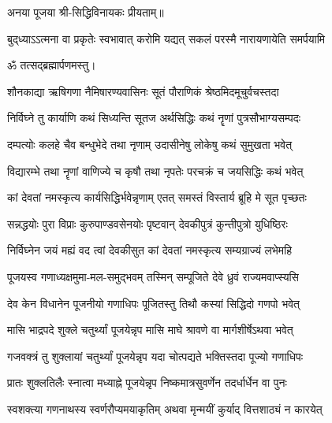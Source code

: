 \begin{center}
अनया पूजया श्री-सिद्धिविनायकः प्रीयताम्॥ 

{बुद्‌ध्याऽऽत्मना वा प्रकृतेः स्वभावात्}
{करोमि यद्यत् सकलं परस्मै}
{नारायणायेति समर्पयामि}

ॐ तत्सद्ब्रह्मार्पणमस्तु।


\twolineshloka
{शौनकाद्या ऋषिगणा नैमिषारण्यवासिनः}
{सूतं पौराणिकं श्रेष्ठमिदमूचुर्वचस्तदा}%


\twolineshloka
{निर्विघ्ने तु कार्याणि कथं सिध्यन्ति सूतज}
{अर्थसिद्धिः कथं नॄणां पुत्रसौभाग्यसम्पदः}%

\twolineshloka
{दम्पत्योः कलहे चैव बन्धुभेदे तथा नृणाम्}
{उदासीनेषु लोकेषु कथं सुमुखता भवेत्}%

\twolineshloka
{विद्यारम्भे तथा नॄणां वाणिज्ये च कृषौ तथा}
{नृपतेः परचक्रं च जयसिद्धिः कथं भवेत्}%

\twolineshloka
{कां देवतां नमस्कृत्य कार्यसिद्धिर्भवेन्नृणाम्}
{एतत् समस्तं विस्तार्य ब्रूहि मे सूत पृच्छतः}%

\twolineshloka
{सन्नद्धयोः पुरा विप्राः कुरुपाण्डवसेनयोः}
{पृष्टवान् देवकीपुत्रं कुन्तीपुत्रो युधिष्ठिरः}%


\twolineshloka
{निर्विघ्नेन जयं मह्यं वद त्वां देवकीसुत}
{कां देवतां नमस्कृत्य सम्यग्राज्यं लभेमहि}%


\twolineshloka
{पूजयस्व गणाध्यक्षमुमा-मल-समुद्भवम्}
{तस्मिन् सम्पूजिते देवे ध्रुवं राज्यमवाप्स्यसि}%


\twolineshloka
{देव केन विधानेन पूजनीयो गणाधिपः}
{पूजितस्तु तिथौ कस्यां सिद्धिदो गणपो भवेत्}%


\twolineshloka
{मासि भाद्रपदे शुक्ले चतुर्थ्यां पूजयेन्नृप}
{मासि माघे श्रावणे वा मार्गशीर्षेऽथवा भवेत्}%

\twolineshloka
{गजवक्त्रं तु शुक्लायां चतुर्थ्यां पूजयेन्नृप}
{यदा चोत्पद्यते भक्तिस्तदा पूज्यो गणाधिपः}%

\twolineshloka
{प्रातः शुक्लतिलैः स्नात्वा मध्याह्ने पूजयेन्नृप}
{निष्कमात्रसुवर्णेन तदर्धार्धेन वा पुनः}%

\twolineshloka
{स्वशक्त्या गणनाथस्य स्वर्णरौप्यमयाकृतिम्}
{अथवा मृन्मयीं कुर्याद् वित्तशाठ्यं न कारयेत्}%


\end{center}
